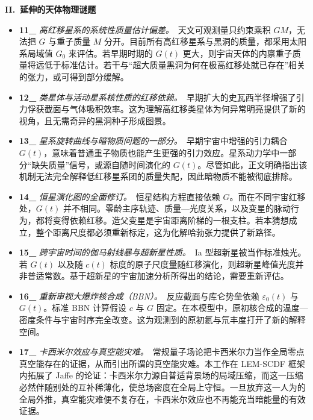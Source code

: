 \documentclass[12pt,leqno]{article}
\begin{document}
	
	\medskip
	\bigskip
	\textbf{II.\ 延伸的天体物理谜题}
	\begin{itemize}
		\item \textbf{11\_} \textit{高红移星系的系统性质量估计偏差。}\,\,\,天文可观测量只约束乘积 $GM$，无法把 $G$ 与重子质量 $M$ 分开。目前所有高红移星系与黑洞的质量，都采用太阳系局域值 $G_0$ 来评估。若早期时期的 $G(t)$ 更大，则宇宙天体的内禀重子质量将远低于标准估计。若干与“超大质量黑洞为何在极高红移处就已存在”相关的张力，或可得到部分缓解。
		
		\item \textbf{12\_} \textit{类星体与活动星系核性质的红移依赖。}\,\,\,早期扩大的史瓦西半径增强了引力俘获截面与气体吸积效率。这为理解高红移类星体为何异常明亮提供了新的视角，且无需奇异的黑洞种子形成图景。
		
		\item \textbf{13\_} \textit{星系旋转曲线与暗物质问题的一部分。}\,\,\,早期宇宙中增强的引力耦合 $G(t)$，意味着普通重子物质也能产生更强的引力效应。星系动力学中一部分“缺失质量”信号，或源自随时间演化的 $G(t)$。尽管如此，正文明确指出该机制无法完全解释低红移星系团的质量失配，因此暗物质不能被彻底排除。
		
		\item \textbf{14\_} \textit{恒星演化图的全面修订。}\,\,\,恒星结构方程直接依赖 $G$。而在不同宇宙红移处，$G(t)$ 并不相同。零龄主序轨迹、质量—光度关系，以及变星的脉动行为，都将变得依赖红移。造父变星是宇宙距离阶梯的一根支柱。若本猜想成立，整个距离尺度都必须重新标定，这为化解哈勃张力提供了新路径。
		
		\item \textbf{15\_} \textit{跨宇宙时间的伽马射线暴与超新星性质。}\,\,\,Ia 型超新星被当作标准烛光。若 $G(t)$ 以及随 $c(t)$ 标度的原子尺度量随红移演化，则超新星峰值光度并非普适常数。基于超新星的宇宙加速分析所得出的结论，需要重新评估。
		
		\item \textbf{16\_} \textit{重新审视大爆炸核合成（BBN）。}\,\,\,反应截面与库仑势垒依赖 $\varepsilon_0(t)$ 与 $G(t)$。标准 BBN 计算假设 $c$ 与 $G$ 固定。在本模型中，原初核合成的温度—密度条件与宇宙时序完全改变。这为观测到的原初氦与氘丰度打开了新的解释空间。
		
		\item \textbf{17\_} \textit{卡西米尔效应与真空能灾难。}\,\,\,常规量子场论把卡西米尔力当作全局零点真空能存在的证据，从而引出所谓的真空能灾难。本工作在 LEM-SCDF 框架内拓展了 Jaffe 的论证：卡西米尔力源自普适背景场的局域压缩，而这一压缩必然伴随别处的互补稀薄化，使总场密度在全局上守恒。一旦放弃这一人为的全局外推，真空能灾难便不复存在，卡西米尔效应也不再能充当暗能量的有效证据。
	\end{itemize}
	
\end{document}
